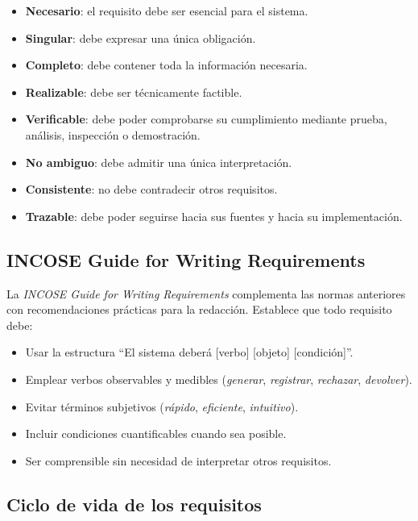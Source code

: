 \begin{itemize}
    \item \textbf{Necesario}: el requisito debe ser esencial para el sistema.
    \item \textbf{Singular}: debe expresar una \'unica obligaci\'on.
    \item \textbf{Completo}: debe contener toda la informaci\'on necesaria.
    \item \textbf{Realizable}: debe ser t\'ecnicamente factible.
    \item \textbf{Verificable}: debe poder comprobarse su cumplimiento mediante prueba, an\'alisis, inspecci\'on o demostraci\'on.
    \item \textbf{No ambiguo}: debe admitir una \'unica interpretaci\'on.
    \item \textbf{Consistente}: no debe contradecir otros requisitos.
    \item \textbf{Trazable}: debe poder seguirse hacia sus fuentes y hacia su implementaci\'on.
\end{itemize}

\subsection{INCOSE Guide for Writing Requirements}

La \textit{INCOSE Guide for Writing Requirements} \cite{incose} complementa las normas anteriores con recomendaciones pr\'acticas para la redacci\'on. Establece que todo requisito debe:

\begin{itemize}
    \item Usar la estructura ``El sistema deber\'a [verbo] [objeto] [condici\'on]''.
    \item Emplear verbos observables y medibles (\emph{generar}, \emph{registrar}, \emph{rechazar}, \emph{devolver}).
    \item Evitar t\'erminos subjetivos (\emph{r\'apido}, \emph{eficiente}, \emph{intuitivo}).
    \item Incluir condiciones cuantificables cuando sea posible.
    \item Ser comprensible sin necesidad de interpretar otros requisitos.
\end{itemize}

\subsection{Ciclo de vida de los requisitos}

